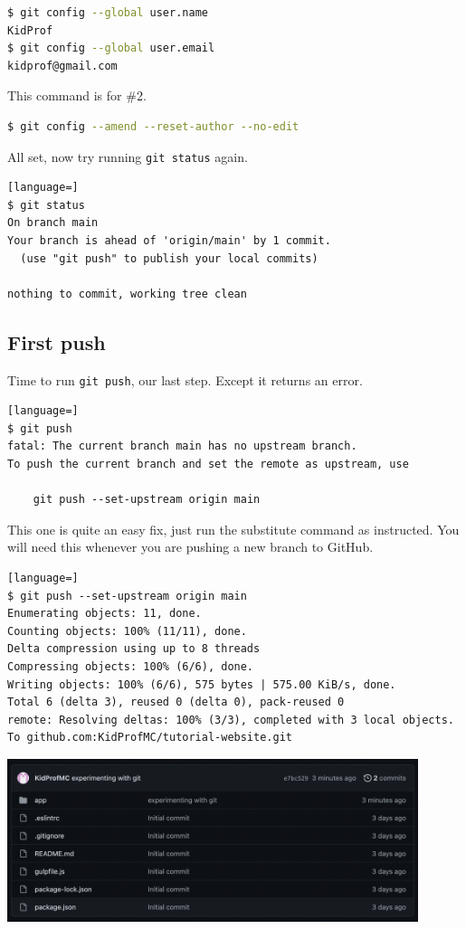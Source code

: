 \begin{lstlisting}[language=bash]
$ git config --global user.name
KidProf
$ git config --global user.email
kidprof@gmail.com
\end{lstlisting}

This command is for \#2.

\begin{lstlisting}[language=bash]
$ git config --amend --reset-author --no-edit
\end{lstlisting}

All set, now try running \texttt{git status} again.

\begin{lstlisting}[language=]
$ git status
On branch main
Your branch is ahead of 'origin/main' by 1 commit.
  (use "git push" to publish your local commits)

nothing to commit, working tree clean
\end{lstlisting}

\subsection*{First push}

Time to run \texttt{git push}, our last step. Except it returns an error.

\begin{lstlisting}[language=]
$ git push
fatal: The current branch main has no upstream branch.
To push the current branch and set the remote as upstream, use

    git push --set-upstream origin main
\end{lstlisting}

This one is quite an easy fix, just run the substitute command as instructed. You will need this whenever you are pushing a new branch to GitHub.

\begin{lstlisting}[language=]
$ git push --set-upstream origin main
Enumerating objects: 11, done.
Counting objects: 100% (11/11), done.
Delta compression using up to 8 threads
Compressing objects: 100% (6/6), done.
Writing objects: 100% (6/6), 575 bytes | 575.00 KiB/s, done.
Total 6 (delta 3), reused 0 (delta 0), pack-reused 0
remote: Resolving deltas: 100% (3/3), completed with 3 local objects.
To github.com:KidProfMC/tutorial-website.git
\end{lstlisting}

\begin{center}
\includegraphics[width=12cm]{images/ch3-firstpushsuccess.png}
\end{center}

